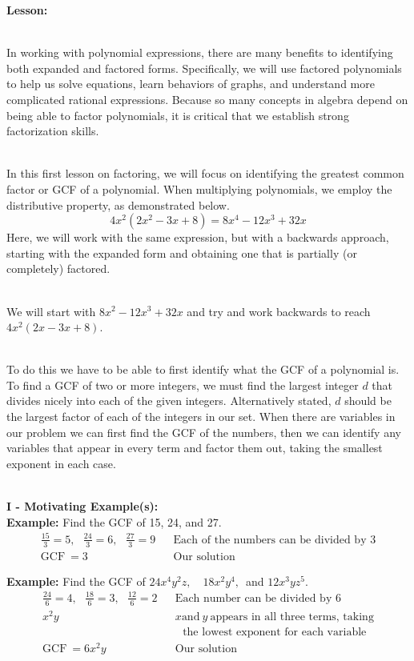 \documentclass[12pt]{article}
\theoremstyle{definition}
\begin{document}
{\bf Lesson:}\\
\ \par
In working with polynomial expressions, there are many benefits to identifying both expanded and factored forms.  Specifically, we will use factored polynomials to help us solve equations, learn behaviors of graphs, and understand more complicated rational expressions.  Because so many concepts in algebra depend on being able to factor polynomials, it is critical that we establish strong factorization skills.\\
\ \par
In this first lesson on factoring, we will focus on identifying the greatest common factor or GCF of a polynomial.  When multiplying polynomials, we employ the distributive property, as demonstrated below.
$$4 x^2 (2 x^2 - 3 x + 8) = 8 x^4 - 12 x^3 + 32 x$$
Here, we will work with the same expression, but with a backwards approach, starting with the expanded form and obtaining one that is partially (or completely) factored.\\
\ \par
We will start with $8 x^2 - 12 x^3 + 32 x$ and try and work backwards to reach $4 x^2 (2 x - 3 x + 8)$.\\
\ \par
To do this we have to be able to first identify what the GCF of a
polynomial is. To find a GCF of two or more integers, we must find the largest integer $d$ that divides nicely into each of the given integers.  Alternatively stated, $d$ should be the largest factor of each of the integers in our set.  When there are variables in our problem we can first find the GCF of the numbers, then we can identify any variables that appear in every term and factor them out, taking the smallest exponent in each case.\\
\ \par
{\bf I - Motivating Example(s):}\\

{\bf Example:} Find the GCF of 15, 24, and 27.
  \begin{eqnarray*}
    \frac{15}{3} = 5,~~~ \frac{24}{3} = 6,~~~ \frac{27}{3} = 9 &  & \text{Each of the numbers can be divided by 3}\\
    \text{GCF} \ = 3 &  & \text{Our solution}
  \end{eqnarray*}

{\bf Example:} Find the GCF of $24 x^4 y^2 z,$~~$18 x^2 y^4,$~and $12 x^3 y z^5$.
  \begin{eqnarray*}
    \frac{24}{6} = 4,~~~ \frac{18}{6} = 3,~~~ \frac{12}{6} = 2 &  & \text{Each number can be divided by 6}\\
    x^2 y &  & x \text{and} \ y \ \text{appears in all three terms, taking}\\
		& & ~~~\text{the lowest exponent for each variable}\\
    \text{GCF} \ = 6 x^2 y &  & \text{Our solution}
  \end{eqnarray*}
\end{document}
